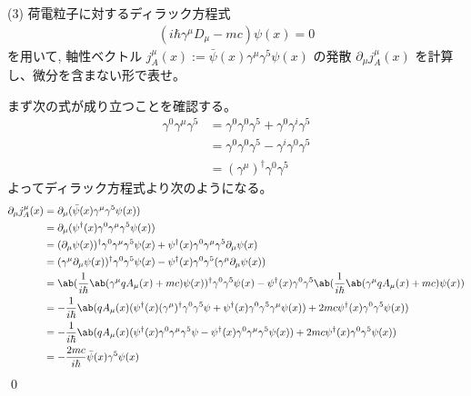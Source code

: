 \documentclass[uplatex,dvipdfmx,a4paper,11pt]{jlreq}
\makeatletter
\numberwithin{equation}{section}
\theoremstyle{definition}
\renewenvironment{proof}[1][\proofname]{\par
  \normalfont
  \topsep6\p@\@plus6\p@ \trivlist
  \item[\hskip\labelsep{\bfseries #1}\@addpunct{\bfseries}]\ignorespaces\quad\par
}{%
  \qed\endtrivlist\@endpefalse
}
\renewcommand\proofname{証明}
\makeatother
\begin{document}
(3) 荷電粒子に対するディラック方程式
\begin{align}
  (i\hbar\gamma^\mu D_\mu - mc)\psi(x) = 0
\end{align}
を用いて, 軸性ベクトル $j_A^\mu(x) := \bar{\psi}(x)\gamma^\mu\gamma^5\psi(x)$ の発散 $\partial_\mu j_A^\mu(x)$ を計算し、微分を含まない形で表せ。
\begin{proof}
  まず次の式が成り立つことを確認する。
  \begin{align}
    \gamma^0\gamma^\mu\gamma^5 & = \gamma^0\gamma^0\gamma^5 + \gamma^0\gamma^i\gamma^5 \\
                               & = \gamma^0\gamma^0\gamma^5 - \gamma^i\gamma^0\gamma^5 \\
                               & = (\gamma^\mu)^\dagger\gamma^0\gamma^5
  \end{align}
  よってディラック方程式より次のようになる。
  \begin{align}
    \partial_\mu j_A^\mu(x) & = \partial_\mu(\bar{\psi}(x)\gamma^\mu\gamma^5\psi(x))                                                                                                                                     \\
                            & = \partial_\mu(\psi^\dagger(x)\gamma^0\gamma^\mu\gamma^5\psi(x))                                                                                                                           \\
                            & = (\partial_\mu\psi(x))^\dagger\gamma^0\gamma^\mu\gamma^5\psi(x) + \psi^\dagger(x)\gamma^0\gamma^\mu\gamma^5\partial_\mu\psi(x)                                                            \\
                            & = (\gamma^\mu\partial_\mu\psi(x))^\dagger\gamma^0\gamma^5\psi(x) - \psi^\dagger(x)\gamma^0\gamma^5(\gamma^\mu\partial_\mu\psi(x))                                                          \\
                            & = \ab(\frac{1}{i\hbar}\ab(\gamma^\mu qA_\mu(x) + mc)\psi(x))^\dagger\gamma^0\gamma^5\psi(x) - \psi^\dagger(x)\gamma^0\gamma^5\ab(\frac{1}{i\hbar}\ab(\gamma^\mu qA_\mu(x) + mc)\psi(x))    \\
                            & = -\frac{1}{i\hbar}\ab(qA_\mu(x)(\psi^\dagger(x)(\gamma^\mu)^\dagger\gamma^0\gamma^5\psi + \psi^\dagger(x)\gamma^0\gamma^5\gamma^\mu \psi(x)) + 2mc\psi^\dagger(x)\gamma^0\gamma^5\psi(x)) \\
                            & = -\frac{1}{i\hbar}\ab(qA_\mu(x)(\psi^\dagger(x)\gamma^0\gamma^\mu\gamma^5\psi - \psi^\dagger(x)\gamma^0\gamma^\mu\gamma^5 \psi(x)) + 2mc\psi^\dagger(x)\gamma^0\gamma^5\psi(x))           \\
                            & = -\frac{2mc}{i\hbar}\bar{\psi}(x)\gamma^5\psi(x)
  \end{align}
\end{proof}
\end{document}
